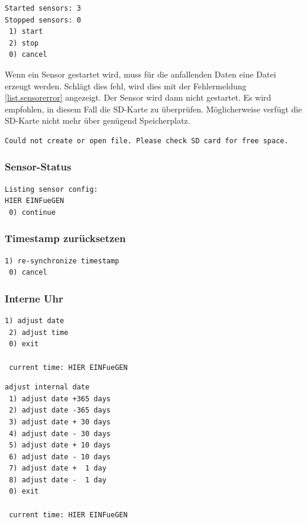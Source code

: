 \begin{lstlisting}[caption=Untermenü Start/Stop alle Sensoren, label=list.started_all]
Started sensors: 3
Stopped sensors: 0
 1) start
 2) stop
 0) cancel
\end{lstlisting}

Wenn ein Sensor gestartet wird, muss für die anfallenden Daten eine Datei erzeugt werden. Schlägt dies fehl, wird dies mit der Fehlermeldung \ref{list.sensorerror} angezeigt. Der Sensor wird dann nicht gestartet. Es wird empfohlen, in diesem Fall die SD-Karte zu überprüfen. Möglicherweise verfügt die SD-Karte nicht mehr über genügend Speicherplatz.

\begin{lstlisting}[caption=Fehlermeldung beim Starten eines Sensors, label=list.sensorerror]
Could not create or open file. Please check SD card for free space.
\end{lstlisting}

\subsubsection{Sensor-Status}\label{sssec.sensorstate}
\begin{lstlisting}[caption=Untermenü Sensor-Status, label=list.sensorstatus]
Listing sensor config:
HIER EINFueGEN
 0) continue
\end{lstlisting}


\subsubsection{Timestamp zurücksetzen}\label{sssec.timestamp}
\begin{lstlisting}[caption=Untermenü Timestamp zurücksetzen, label=list.timestamp]
 1) re-synchronize timestamp
 0) cancel
\end{lstlisting}


\subsubsection{Interne Uhr}\label{sssec.intclock}
\begin{lstlisting}[caption=Untermenü interne Uhr, label=list.intclock]
 1) adjust date
 2) adjust time
 0) exit

 current time: HIER EINFueGEN
\end{lstlisting}

\begin{lstlisting}[caption=Untermenü Datum einstellen, label=list.setdate]
adjust internal date
 1) adjust date +365 days
 2) adjust date -365 days
 3) adjust date + 30 days
 4) adjust date - 30 days
 5) adjust date + 10 days
 6) adjust date - 10 days
 7) adjust date +  1 day
 8) adjust date -  1 day
 0) exit

 current time: HIER EINFueGEN
\end{lstlisting}


